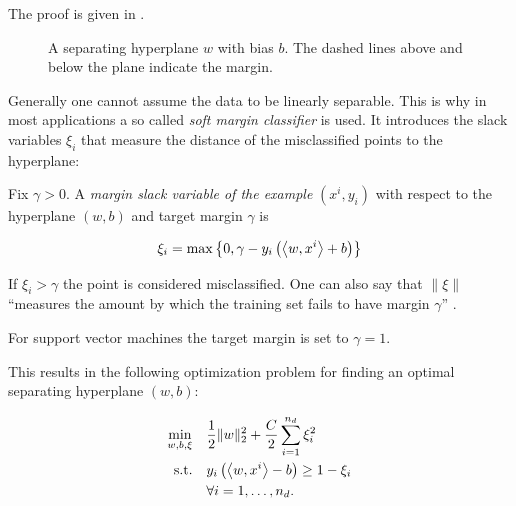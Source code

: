 The proof is given in \cite[chapter 6.1]{Cristianini2000}. 

\begin{figure}[ht]%
	\center
\caption[Separating hyperplane]{A separating hyperplane \(w\) with bias \(b\). The dashed lines above and below the plane indicate the margin.}%
\label{fig_hyperplane}%
\end{figure}

Generally one cannot assume the data to be linearly separable. This is why in most applications a so called \emph{soft margin classifier} is used. It introduces the slack variables \(\xi_i\) that measure the distance of the misclassified points to the hyperplane:


Fix \(\gamma > 0\). A \emph{margin slack variable of the example} \((x^i,y_i)\) with respect to the hyperplane \((w,b)\) and target margin \(\gamma\) is 

\[\xi_i = \max\left\{0, \gamma - y_i\left(\left\langle w,x^i\right\rangle+b\right)\right\}\] 

If \(\xi_i > \gamma\) the point is considered misclassified. 
One can also say that \(\|\xi\|\) ``measures the amount by which the training set fails to have margin \(\gamma\)'' \cite[section 2.1.1]{Cristianini2000}.

For support vector machines the target margin is set to \(\gamma = 1\).


This results in the following optimization problem for finding an optimal separating hyperplane \((w,b)\): 


%
\begin{align}
\begin{split}
	\min_{w,b,\xi} \quad & \frac{1}{2} \|w\|^2_2+\frac{C}{2}\sum_{i=1}^{n_d}{\xi_i^2} \vspace{0.5ex}\\
	\text{s.t.} \quad & y_i\left(\Langle w,x^i\Rangle-b\right) \geq 1 - \xi_i \vspace{0.5ex}\\
	& 	\forall i = 1, \dots , n_d.
\end{split}
\label{SVM_2}
\end{align}

